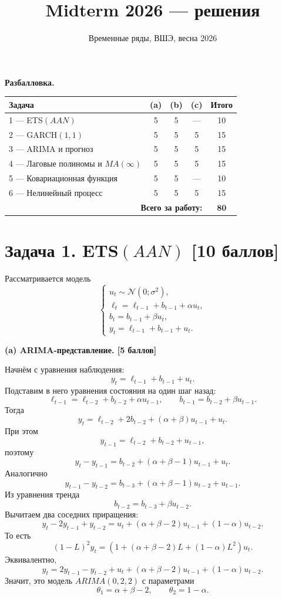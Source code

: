 \documentclass[12pt]{article}
\title{Midterm 2026 --- решения}
\author{Временные ряды, ВШЭ, весна 2026}
\date{}
\newcommand \cN{\mathcal{N}}
\newcommand{\step}[1]{\medskip\noindent\textbf{#1}\par\nobreak\vspace{2pt}}
\begin{document}
\maketitle

\begin{center}
\textbf{Разбалловка.}\\[4pt]
\begin{tabular}{@{}l|ccc|c@{}}
\toprule
Задача & (a) & (b) & (c) & \textbf{Итого} \\
\midrule
1 --- ETS$(AAN)$                         & 5 & 5 & --- & 10 \\
2 --- GARCH$(1,1)$                       & 5 & 5 & 5   & 15 \\
3 --- ARIMA и прогноз                    & 5 & 5 & 5   & 15 \\
4 --- Лаговые полиномы и $MA(\infty)$    & 5 & 5 & 5   & 15 \\
5 --- Ковариационная функция             & 5 & 5 & --- & 10 \\
6 --- Нелинейный процесс                 & 5 & 5 & 5   & 15 \\
\midrule
\multicolumn{4}{r|}{\textbf{Всего за работу:}} & \(\mathbf{80}\) \\
\bottomrule
\end{tabular}
\end{center}

\section*{Задача 1. ETS$(AAN)$ \hfill [10 баллов]}

Рассматривается модель
\[
\begin{cases}
u_t \sim \cN(0;\sigma^2),\\
\ell_t = \ell_{t-1} + b_{t-1} + \alpha u_t,\\
b_t = b_{t-1} + \beta u_t,\\
y_t = \ell_{t-1} + b_{t-1} + u_t.
\end{cases}
\]

\step{(a) ARIMA-представление. \hfill [5 баллов]}
Начнём с уравнения наблюдения:
\[
y_t=\ell_{t-1}+b_{t-1}+u_t.
\]
Подставим в него уравнения состояния на один шаг назад:
\[
\ell_{t-1}=\ell_{t-2}+b_{t-2}+\alpha u_{t-1},
\qquad
b_{t-1}=b_{t-2}+\beta u_{t-1}.
\]
Тогда
\[
y_t=\ell_{t-2}+2b_{t-2}+(\alpha+\beta)u_{t-1}+u_t.
\]
При этом
\[
y_{t-1}=\ell_{t-2}+b_{t-2}+u_{t-1},
\]
поэтому
\[
y_t-y_{t-1}=b_{t-2}+(\alpha+\beta-1)u_{t-1}+u_t.
\]
Аналогично
\[
y_{t-1}-y_{t-2}=b_{t-3}+(\alpha+\beta-1)u_{t-2}+u_{t-1}.
\]
Из уравнения тренда
\[
b_{t-2}=b_{t-3}+\beta u_{t-2}.
\]
Вычитаем два соседних приращения:
\[
y_t-2y_{t-1}+y_{t-2}
=u_t+(\alpha+\beta-2)u_{t-1}+(1-\alpha)u_{t-2}.
\]
То есть
\[
(1-L)^2y_t=(1+(\alpha+\beta-2)L+(1-\alpha)L^2)u_t.
\]
Эквивалентно,
\[
\boxed{
y_t=2y_{t-1}-y_{t-2}+u_t+(\alpha+\beta-2)u_{t-1}+(1-\alpha)u_{t-2}.
}
\]
Значит, это модель $ARIMA(0,2,2)$ с параметрами
\[
\theta_1=\alpha+\beta-2,\qquad \theta_2=1-\alpha.
\]
\end{document}
